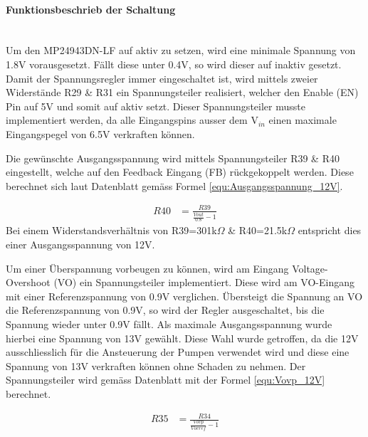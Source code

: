 \paragraph{Funktionsbeschrieb der Schaltung}\mbox{}\\

Um den MP24943DN-LF auf aktiv zu setzen, wird eine minimale Spannung von 1.8V vorausgesetzt. Fällt diese unter 0.4V, so wird dieser auf inaktiv gesetzt. Damit der Spannungsregler immer eingeschaltet ist, wird mittels zweier Widerstände R29 \& R31 ein Spannungsteiler realisiert, welcher den Enable (EN) Pin auf 5V und somit auf aktiv setzt. Dieser Spannungsteiler musste implementiert werden, da alle Eingangspins ausser dem V$_{in}$ einen maximale Eingangspegel von 6.5V verkraften können.\cite[S.3]{monolithic_power_systems_mp24943_2011} 

Die gewünschte Ausgangsspannung wird mittels Spannungsteiler R39 \& R40 eingestellt, welche auf den Feedback Eingang (FB) rückgekoppelt werden. Diese berechnet sich laut Datenblatt gemäss Formel \ref{equ:Ausgangsspannung_12V}. \cite[S.10]{monolithic_power_systems_mp24943_2011}

\begin{align}
R40 &= \frac{R39}{\frac{Vout}{0.8}-1}
\label{equ:Ausgangsspannung_12V}
\end{align}
Bei einem Widerstandsverhältnis von R39=301k$\Omega$ \& R40=21.5k$\Omega$ entspricht dies einer Ausgangsspannung von 12V. \cite[S.10]{monolithic_power_systems_mp24943_2011}

Um einer Überspannung vorbeugen zu können, wird am Eingang Voltage-Overshoot (VO) ein Spannungsteiler implementiert. Diese wird am VO-Eingang mit einer Referenzspannung von 0.9V verglichen. Übersteigt die Spannung an VO die Referenzspannung von 0.9V, so wird der Regler ausgeschaltet, bis die Spannung wieder unter 0.9V fällt. Als maximale Ausgangsspannung wurde hierbei eine Spannung von 13V gewählt. Diese Wahl wurde getroffen, da die 12V ausschliesslich für die Ansteuerung der Pumpen verwendet wird und diese eine Spannung von 13V verkraften können ohne Schaden zu nehmen. Der Spannungsteiler wird gemäss Datenblatt mit der Formel \ref{equ:Vovp_12V} berechnet. \cite[S.10]{monolithic_power_systems_mp24943_2011} \cite{aiyimaindustrial_store_us_nodate}

\begin{align}
R35 &= \frac{R34}{\frac{Vovp}{Vovref}-1}
\label{equ:Vovp_12V}
\end{align}

